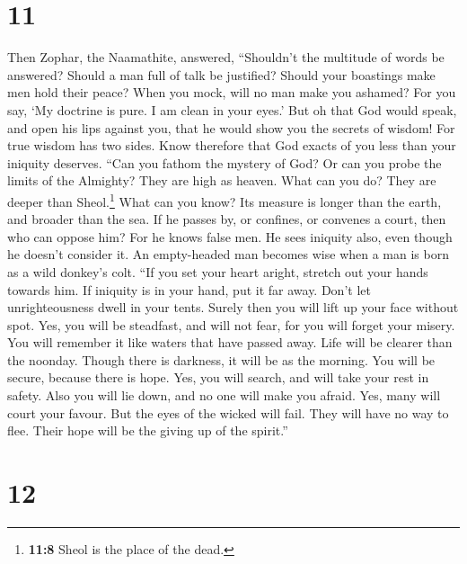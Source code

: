 \hypertarget{section-10}{%
\section{11}\label{section-10}}

 Then Zophar, the Naamathite, answered, 
``Shouldn't the multitude of words be answered? Should a man full of
talk be justified?  Should your boastings make men hold
their peace? When you mock, will no man make you ashamed? 
For you say, `My doctrine is pure. I am clean in your eyes.'
 But oh that God would speak, and open his lips against
you,  that he would show you the secrets of wisdom! For
true wisdom has two sides. Know therefore that God exacts of you less
than your iniquity deserves.  ``Can you fathom the mystery
of God? Or can you probe the limits of the Almighty?  They
are high as heaven. What can you do? They are deeper than
Sheol.\footnote{\textbf{11:8} Sheol is the place of the dead.} What can
you know?  Its measure is longer than the earth, and
broader than the sea.  If he passes by, or confines, or
convenes a court, then who can oppose him?  For he knows
false men. He sees iniquity also, even though he doesn't consider it.
 An empty-headed man becomes wise when a man is born as a
wild donkey's colt.  ``If you set your heart aright,
stretch out your hands towards him.  If iniquity is in
your hand, put it far away. Don't let unrighteousness dwell in your
tents.  Surely then you will lift up your face without
spot. Yes, you will be steadfast, and will not fear,  for
you will forget your misery. You will remember it like waters that have
passed away.  Life will be clearer than the noonday.
Though there is darkness, it will be as the morning.  You
will be secure, because there is hope. Yes, you will search, and will
take your rest in safety.  Also you will lie down, and no
one will make you afraid. Yes, many will court your favour.
 But the eyes of the wicked will fail. They will have no
way to flee. Their hope will be the giving up of the spirit.''

\hypertarget{section-11}{%
\section{12}\label{section-11}}

